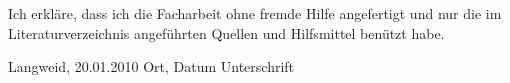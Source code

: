 \vspace{10cm}

Ich erkläre, dass ich die Facharbeit ohne fremde Hilfe angefertigt 
und nur die im Literaturverzeichnis angeführten Quellen und 
Hilfsmittel benützt habe.

\vspace{10cm}

   Langweid, 20.01.2010  				                         
	Ort, Datum						Unterschrift
